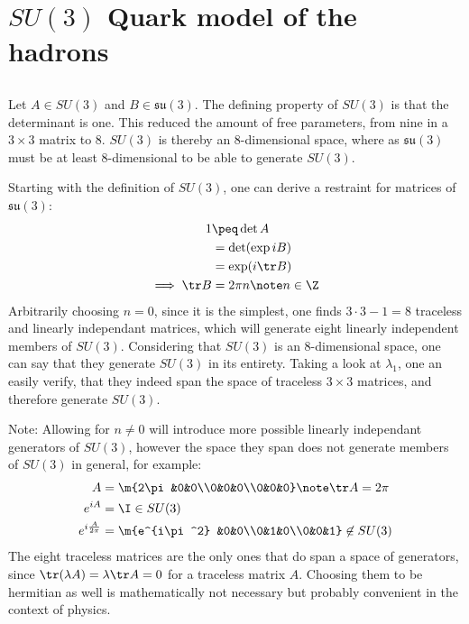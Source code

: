 \documentclass[exb,en]{exercise_5.0}
\begin{document}
\section{$SU(3)$ Quark model of the hadrons}
\subsection{}
Let $A\in SU(3)$ and $B\in\mathfrak{su}(3)$. The defining property of $SU(3)$ is that the determinant is one. This reduced the amount of free parameters, from nine in a $3\times3$ matrix to 8. 
$SU(3)$ is thereby an 8-dimensional space, where as $\mathfrak{su}(3)$ must be at least 8-dimensional to be able to generate $SU(3)$.

Starting with the definition of $SU(3)$, one can derive a restraint for matrices of $\mathfrak{su}(3)$:
\begin{align*}
    1&\peq\det A\\
    &= \det (\exp i B )\\
    &= \exp (i \tr B)\\
    \implies \tr B &= 2\pi n \note n\in\Z
\end{align*}
Arbitrarily choosing $n=0$, since it is the simplest, one finds $3\cdot3-1=8$ traceless and linearly independant matrices, which will generate eight linearly independent members of $SU(3)$. Considering that $SU(3)$ is an 8-dimensional space, one can say that they generate $SU(3)$ in its entirety.
Taking a look at $\lambda_1$, one an easily verify, that they indeed span the space of traceless $3\times 3$ matrices, and therefore generate $SU(3)$.

Note: Allowing for $n\neq0$ will introduce more possible linearly independant generators of $SU(3)$, however the space they span does not generate members of $SU(3)$ in general, for example:
\begin{align*}
    A &= \m{2\pi &0&0\\0&0&0\\0&0&0}\note \tr A = 2\pi\\
    e^{iA} &= \I \in SU(3)\\
    e^{i \frac{A}{2\pi}} &= \m{e^{i\pi^2} &0&0\\0&1&0\\0&0&1}\not\in SU(3)
\end{align*}
The eight traceless matrices are the only ones that do span a space of generators, since $\tr(\lambda A) = \lambda \tr A = 0$ for a traceless matrix $A$. Choosing them to be hermitian as well is mathematically not necessary but probably convenient in the context of physics.
\end{document}
